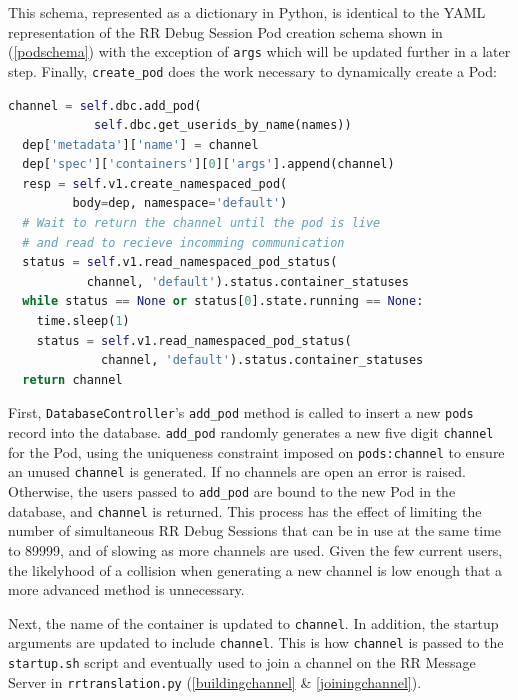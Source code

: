 \documentclass[12pt]{article}
\begin{document}
This schema, represented as a dictionary in Python, is identical to
the YAML representation of the RR Debug Session Pod creation schema
shown in (\ref{podschema}) with the exception of \lstinline{args}
which will be updated further in a later step.  Finally,
\lstinline{create_pod} does the
work necessary to dynamically create a Pod:

\begin{lstlisting}[language=Python,basicstyle=\linespread{0.5}\ttfamily,caption={Pod Creation 3},captionpos=b]
  channel = self.dbc.add_pod(
            self.dbc.get_userids_by_name(names))
  dep['metadata']['name'] = channel
  dep['spec']['containers'][0]['args'].append(channel)
  resp = self.v1.create_namespaced_pod(
         body=dep, namespace='default')
  # Wait to return the channel until the pod is live
  # and read to recieve incomming communication
  status = self.v1.read_namespaced_pod_status(
           channel, 'default').status.container_statuses
  while status == None or status[0].state.running == None:
    time.sleep(1)
    status = self.v1.read_namespaced_pod_status(
             channel, 'default').status.container_statuses
  return channel
\end{lstlisting}

First, \lstinline{DatabaseController}'s \lstinline{add_pod} method is
called to insert a new \lstinline{pods} record into the database.
\lstinline{add_pod} randomly generates a new five digit
\lstinline{channel} for the Pod, using the uniqueness constraint
imposed on \lstinline{pods:channel} to ensure an unused
\lstinline{channel} is generated.  If no channels are open an error is
raised.  Otherwise, the users passed to \lstinline{add_pod} are bound
to the new Pod in the database, and \lstinline{channel} is returned.
This process has the effect of limiting the number of simultaneous RR
Debug Sessions that can be in use at the same time to 89999, and of
slowing as more channels are used.  Given the few current users, the
likelyhood of a collision when generating a new channel is low enough
that a more advanced method is unnecessary.
\par

Next, the name of the container is updated to \lstinline{channel}.  In
addition, the startup arguments are updated to include
\lstinline{channel}.  This is how \lstinline{channel} is passed to the
\lstinline{startup.sh} script and eventually used to join a channel on
the RR Message Server in \lstinline{rrtranslation.py}
(\ref{buildingchannel} \& \ref{joiningchannel}).
\par
\end{document}
